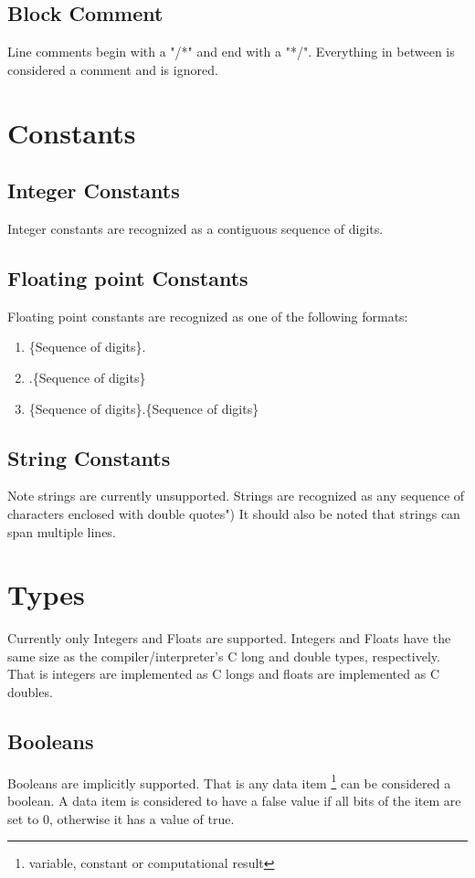 \documentclass{standalone}
\begin{document}
		\subsection{Block Comment}
			Line comments begin with a "/*"  and end with a "*/". Everything in between is considered a comment and is ignored.

	\section{Constants}
		\subsection{Integer Constants}
			Integer constants are recognized as a contiguous sequence of digits.
		\subsection{Floating point Constants}
			Floating point constants are recognized as one of the following formats:
			\begin{enumerate}
				\item \{Sequence of digits\}.
				\item .\{Sequence of digits\}
				\item \{Sequence of digits\}.\{Sequence of digits\}
			\end{enumerate}
		\subsection{String Constants}
			Note strings are currently unsupported.
			Strings are recognized as any sequence of characters enclosed with double quotes") It should also be noted that strings can span multiple lines.

	\section{Types}
		Currently only Integers and Floats are supported. Integers and Floats have the same size as the compiler/interpreter's C long and double types, respectively. That is integers are implemented as C longs and floats are implemented as C doubles.

		\subsection{Booleans}
			Booleans are implicitly supported. That is any data item \footnote{ variable, constant or computational result} can be considered a boolean. A data item is considered to have a false value if all bits of the item are set to 0, otherwise it has a value of true.
\end{document}
